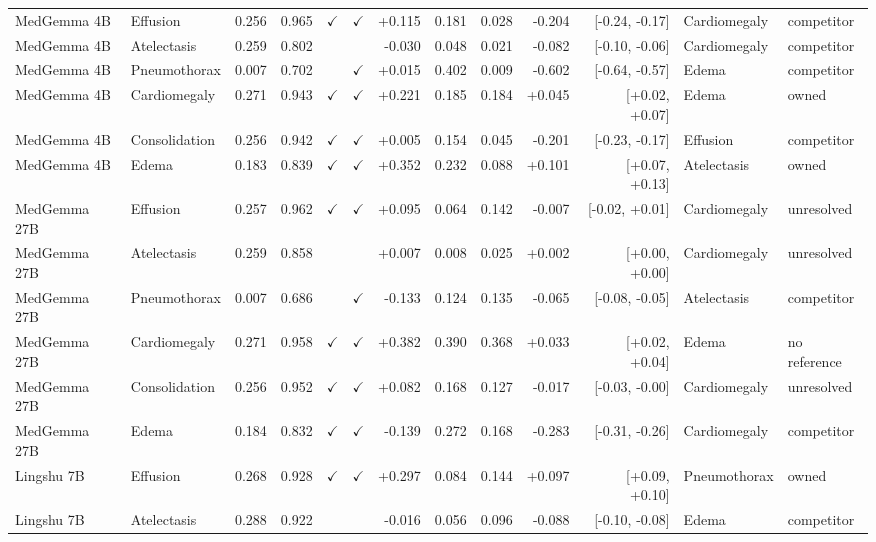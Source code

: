 \begin{longtable}{llrrccrrrrrll}
MedGemma 4B & Effusion & 0.256 & 0.965 & $\checkmark$ & $\checkmark$ & +0.115 & 0.181 & 0.028 & -0.204 & [-0.24, -0.17] & Cardiomegaly & competitor \\
MedGemma 4B & Atelectasis & 0.259 & 0.802 &  &  & -0.030 & 0.048 & 0.021 & -0.082 & [-0.10, -0.06] & Cardiomegaly & competitor \\
MedGemma 4B & Pneumothorax & 0.007 & 0.702 &  & $\checkmark$ & +0.015 & 0.402 & 0.009 & -0.602 & [-0.64, -0.57] & Edema & competitor \\
\rowcolor{cfSlate2}MedGemma 4B & Cardiomegaly & 0.271 & 0.943 & $\checkmark$ & $\checkmark$ & +0.221 & 0.185 & 0.184 & +0.045 & [+0.02, +0.07] & Edema & owned \\
MedGemma 4B & Consolidation & 0.256 & 0.942 & $\checkmark$ & $\checkmark$ & +0.005 & 0.154 & 0.045 & -0.201 & [-0.23, -0.17] & Effusion & competitor \\
\rowcolor{cfSlate2}MedGemma 4B & Edema & 0.183 & 0.839 & $\checkmark$ & $\checkmark$ & +0.352 & 0.232 & 0.088 & +0.101 & [+0.07, +0.13] & Atelectasis & owned \\
MedGemma 27B & Effusion & 0.257 & 0.962 & $\checkmark$ & $\checkmark$ & +0.095 & 0.064 & 0.142 & -0.007 & [-0.02, +0.01] & Cardiomegaly & unresolved \\
MedGemma 27B & Atelectasis & 0.259 & 0.858 &  &  & +0.007 & 0.008 & 0.025 & +0.002 & [+0.00, +0.00] & Cardiomegaly & unresolved \\
MedGemma 27B & Pneumothorax & 0.007 & 0.686 &  & $\checkmark$ & -0.133 & 0.124 & 0.135 & -0.065 & [-0.08, -0.05] & Atelectasis & competitor \\
MedGemma 27B & Cardiomegaly & 0.271 & 0.958 & $\checkmark$ & $\checkmark$ & +0.382 & 0.390 & 0.368 & +0.033 & [+0.02, +0.04] & Edema & no reference \\
MedGemma 27B & Consolidation & 0.256 & 0.952 & $\checkmark$ & $\checkmark$ & +0.082 & 0.168 & 0.127 & -0.017 & [-0.03, -0.00] & Cardiomegaly & unresolved \\
MedGemma 27B & Edema & 0.184 & 0.832 & $\checkmark$ & $\checkmark$ & -0.139 & 0.272 & 0.168 & -0.283 & [-0.31, -0.26] & Cardiomegaly & competitor \\
\rowcolor{cfSlate2}Lingshu 7B & Effusion & 0.268 & 0.928 & $\checkmark$ & $\checkmark$ & +0.297 & 0.084 & 0.144 & +0.097 & [+0.09, +0.10] & Pneumothorax & owned \\
Lingshu 7B & Atelectasis & 0.288 & 0.922 &  &  & -0.016 & 0.056 & 0.096 & -0.088 & [-0.10, -0.08] & Edema & competitor \\

\end{longtable}
